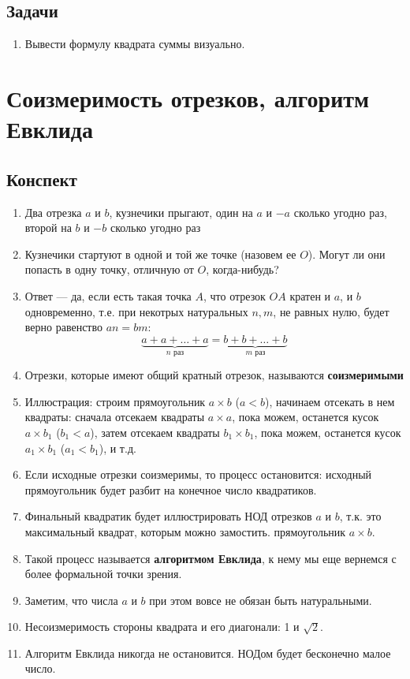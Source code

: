 \subsection*{Задачи}
\begin{enumerate}
\item Вывести формулу квадрата суммы визуально.
\end{enumerate}


\section{Соизмеримость отрезков, алгоритм Евклида}

\subsection*{Конспект}
\begin{enumerate}\setlength{\itemsep}{1pt}
\item Два отрезка $a$ и $b$, кузнечики прыгают, один на $a$ и $-a$ сколько угодно раз, второй на $b$ и $-b$ сколько угодно раз
\item Кузнечики стартуют в одной и той же точке (назовем ее $O$). Могут ли они попасть в одну точку, отличную от $O$, когда-нибудь?
\item Ответ --- да, если есть такая точка $A$, что отрезок $OA$ кратен и $a$, и $b$ одновременно, т.е. при некотрых натуральных $n,m$, не равных нулю, будет верно равенство $an=bm$:
$$
\underbrace{a+a+\dots+a}_{n\mbox{ раз}}=\underbrace{b+b+\dots+b}_{m\mbox{ раз}}
$$
\item Отрезки, которые имеют общий кратный отрезок, называются \textbf{соизмеримыми}
\item Иллюстрация: строим прямоугольник $a\times b$ ($a<b$), начинаем отсекать в нем квадраты: сначала отсекаем квадраты $a\times a$, пока можем, останется кусок $a\times b_1$ ($b_1<a$), затем отсекаем квадраты $b_1\times b_1$, пока можем, останется кусок $a_1\times b_1$ ($a_1<b_1$), и т.д.
\item Если исходные отрезки соизмеримы, то процесс остановится: исходный прямоугольник будет разбит на конечное число квадратиков.
\item Финальный квадратик будет иллюстрировать НОД отрезков $a$ и $b$, т.к. это максимальный квадрат, которым можно замостить. прямоугольник $a\times b$.
\item Такой процесс называется \textbf{алгоритмом Евклида}, к нему мы еще вернемся с более формальной точки зрения.
\item Заметим, что числа $a$ и $b$ при этом вовсе не обязан быть натуральными.
\item Несоизмеримость стороны квадрата и его диагонали: 1 и $\sqrt 2$.
\item Алгоритм Евклида никогда не остановится. НОДом будет бесконечно малое число.
\end{enumerate}
